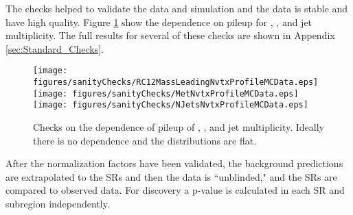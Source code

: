 The checks helped to validate the data and simulation and the data is stable and have high quality.  Figure \ref{fig:nvtxSanityChecksSmall} show the dependence on pileup for \mantikttwelvezero, \met, and jet multiplicity. The full results for several of these checks are shown in Appendix \ref{sec:Standard_Checks}. \\

\begin{figure}[tbh]
	\centering
		\texttt{[image: figures/sanityChecks/RC12MassLeadingNvtxProfileMCData.eps]}	
		\texttt{[image: figures/sanityChecks/MetNvtxProfileMCData.eps]}
		\texttt{[image: figures/sanityChecks/NJetsNvtxProfileMCData.eps]}
	\caption[Checks on the dependence of pileup of \mantikttwelvezero, \met, and jet multiplicity.]{\label{fig:nvtxSanityChecksSmall}{Checks on the dependence of pileup of \mantikttwelvezero, \met, and jet multiplicity.  Ideally there is no dependence and the distributions are flat.}}
\end{figure}


After the normalization factors have been validated, the background predictions are extrapolated to the SRs and then the data is ``unblinded," and the SRs are compared to observed data.  For discovery a p-value is calculated in each SR and subregion independently.  \\


